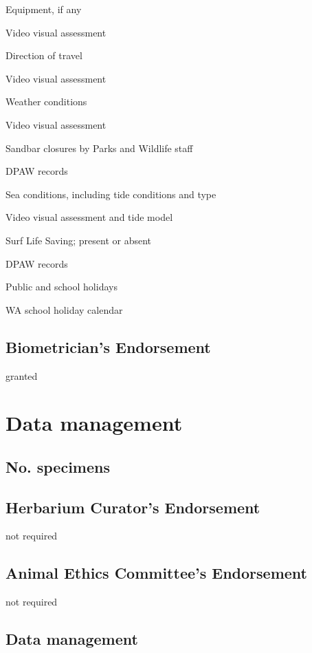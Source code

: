\documentclass[version=last,
    paper=a4,                               %
    10pt,                                   %
    dvipsnames,
    oneside,                              %
    headings=openany,                       %
    open=any,
    BCOR=7mm,                               %
    DIV=15,     %
]{scrbook}
\begin{document}
Equipment, if any

Video visual assessment

Direction of travel

Video visual assessment

Weather conditions

Video visual assessment

Sandbar closures by Parks and Wildlife staff

DPAW records

Sea conditions, including tide conditions and type

Video visual assessment and tide model

Surf Life Saving; present or absent

DPAW records

Public and school holidays

WA school holiday calendar




\subsection*{Biometrician's Endorsement}

granted



\section*{Data management}


\subsection*{No. specimens}






\subsection*{Herbarium Curator's Endorsement}

not required




\subsection*{Animal Ethics Committee's Endorsement}

not required




\subsection*{Data management}
\end{document}
